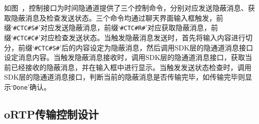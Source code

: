 
如图\ ，控制接口为时间隐通道提供了三个控制命令，分别对应发送隐蔽消息、获取隐蔽消息及检查发送状态。三个命令均通过聊天界面输入框触发，前缀‘\texttt{\#CTC\#S\#}’对应发送隐蔽消息，前缀‘\texttt{\#CTC\#R\#}’对应获取隐蔽消息，前缀‘\texttt{\#CTC\#C\#}’对应检查发送状态。当触发隐蔽消息发送时，首先将输入内容进行切分，前缀‘\texttt{\#CTC\#S\#}’后的内容设定为隐蔽消息，然后调用SDK层的隐通道消息接口设定消息内容。当触发隐蔽消息接收时，调用SDK层的隐通道消息接口，获取当前已经接收的隐蔽消息，并在输入框中进行显示。当触发发送状态检查时，调用SDK层的隐通道消息接口，判断当前的隐蔽消息是否传输完毕，如传输完毕则显示‘\texttt{Done}’确认。

\subsection{oRTP传输控制设计}
\label{chap:linphone:designation:ortp}


